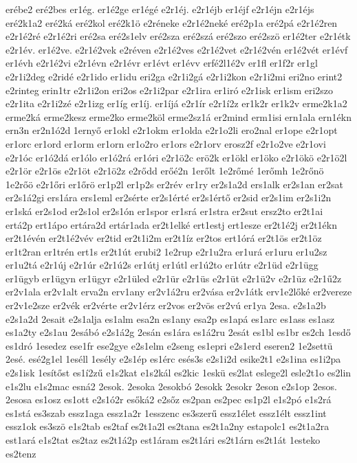 {erébe2
eré2bes
er1ég.
er1é2ge
er1égé
e2r1éj.
e2r1éjb
er1éjf
e2r1éjn
e2r1éjs
eré2k1a2
eré2ká
eré2kol
eré2k1ö
e2réneke
e2r1é2neké
eré2p1a
eré2pá
e2r1é2ren
e2r1é2ré
e2r1é2ri
eré2sa
eré2s1elv
eré2sza
eré2szá
eré2szo
eré2szö
er1é2ter
e2r1étk
e2r1év.
er1é2ve.
e2r1é2vek
e2réven
e2r1é2ves
e2r1é2vet
e2r1é2vén
er1é2vét
er1évf
er1évh
e2r1é2vi
e2r1évn
e2r1évr
er1évt
er1évv
erfé2l1é2v
er1fl
er1f2r
er1gl
e2r1i2deg
e2ridé
e2r1ido
er1idu
eri2ga
e2r1i2gá
e2r1i2kon
e2r1i2mi
eri2no
erint2
e2rinteg
erin1tr
e2r1i2on
eri2os
e2r1i2par
e2r1ira
er1iró
e2r1isk
er1ism
eri2szo
e2r1ita
e2r1i2zé
e2r1izg
er1íg
er1íj.
er1íjá
e2r1ír
e2r1í2z
er1k2r
er1k2v
erme2k1a2
erme2ká
erme2kesz
erme2ko
erme2köl
erme2sz1á
er2mind
erm1isi
ern1ala
ern1ékn
ern3n
er2n1ó2d
1ernyő
er1okl
e2r1okm
er1olda
e2r1o2li
ero2nal
er1ope
e2r1opt
er1orc
er1ord
er1orm
er1orn
er1o2ro
er1ors
e2r1orv
erosz2f
e2r1o2ve
e2r1ovi
e2r1óc
er1ó2dá
er1ólo
er1ó2rá
er1óri
e2r1ö2c
erö2k
er1ökl
er1öko
e2r1ökö
e2r1ö2l
e2r1ör
e2r1ös
e2r1öt
e2r1ö2z
e2rődd
erőé2n
1erőlt
1e2rőmé
1erőmh
1e2rőnö
1e2rőö
e2r1őri
er1őrö
er1p2l
er1p2s
er2rév
er1ry
er2s1a2d
ers1alk
er2s1an
er2sat
er2s1á2gi
ers1ára
ers1eml
er2sérte
er2s1érté
er2s1értő
er2sid
er2s1im
er2s1i2n
er1ská
er2s1od
er2s1ol
er2s1ón
er1spor
er1srá
er1stra
er2sut
ersz2to
er2t1ai
ertá2p
ert1ápo
ertára2d
ertár1ada
er2t1elké
ert1estj
ert1esze
er2t1é2j
er2t1ékn
er2t1évén
er2t1é2vév
er2tid
er2t1i2m
er2t1íz
er2tos
ert1órá
er2t1ös
er2t1öz
er1t2ran
er1trén
ert1s
er2t1út
erubi2
1e2rup
e2r1u2ra
er1urá
er1uru
er1u2sz
er1u2tá
e2r1új
e2r1úr
e2r1ú2s
er1útj
er1útl
er1ú2to
er1útr
e2r1üd
e2r1ügg
er1ügyb
er1ügyn
er1ügyr
e2r1üled
e2r1ür
e2r1üs
e2r1üt
e2r1ü2v
e2r1üz
e2r1ű2z
er2v1ala
er2v1alt
erva2n
erv1any
er2v1á2ru
er2vása
er2v1átk
erv1e2lőké
er2vereze
er2v1e2sze
er2vék
er2vérte
er2v1érz
er2vos
er2vös
er2vú
er1ya
2esa.
e2s1a2b
e2s1a2d
2esait
e2s1alja
es1alm
esa2n
es1any
esa2p
es1apá
es1arc
es1ass
es1asz
es1a2ty
e2s1au
2esábó
e2s1á2g
2esán
es1ára
es1á2ru
2esát
es1bl
es1br
es2ch
1esdő
es1dró
1esedez
ese1fr
ese2gye
e2s1elm
e2seng
es1epri
e2s1erd
eseren2
1e2settü
2esé.
esé2g1el
1eséll
1esély
e2s1ép
es1érc
esés3s
e2s1i2d
esike2t1
e2s1ina
es1i2pa
e2s1isk
1esítőst
es1í2zű
e1s2kat
e1s2kál
es2kic
1eskü
es2lat
eslege2l
esle2t1o
es2lin
e1s2lu
e1s2mac
esná2
2esok.
2esoka
2esokbó
2esokk
2esokr
2eson
e2s1op
2esos.
2esosa
es1osz
es1ott
e2s1ó2r
esőká2
e2sőz
es2pan
es2pec
es1p2l
e1s2pó
e1s2rá
es1stá
es3szab
essz1aga
essz1a2r
1esszenc
es3szerű
essz1élet
essz1élt
essz1int
essz1ok
es3szö
e1s2tab
es2taf
es2t1a2l
es2tana
es2t1a2ny
estapolc1
es2t1a2ra
est1ará
e1s2tat
es2taz
es2t1á2p
est1áram
es2t1ári
es2t1árn
es2t1át
1esteko
es2tenz
}
